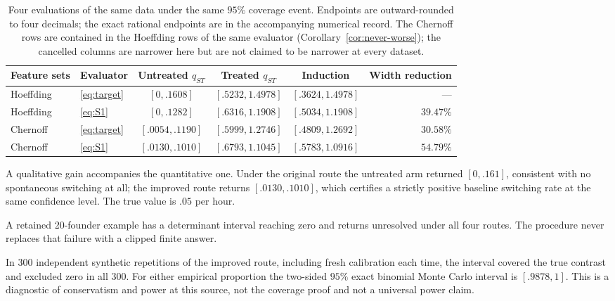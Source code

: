 \documentclass[11pt]{article}
\theoremstyle{definition}
\begin{document}
\begin{table}[tb]
\caption{Four evaluations of the same data under the same $95\%$ coverage event.
Endpoints are outward-rounded to four decimals; the exact rational
endpoints are in the accompanying numerical record. The
Chernoff rows are contained in the Hoeffding rows of the same evaluator
(Corollary~\ref{cor:never-worse}); the cancelled columns are narrower here but
are not claimed to be narrower at every dataset.}
\label{tab:routes}\centering\small
\begin{tabular}{llccc r}
\toprule
Feature sets & Evaluator & Untreated $q_{ST}$ & Treated $q_{ST}$ & Induction &
Width reduction\\
\midrule
Hoeffding & \eqref{eq:target} & $[0,.1608]$ & $[.5232,1.4978]$ & $[.3624,1.4978]$ & ---\\
Hoeffding & \eqref{eq:S1}     & $[0,.1282]$ & $[.6316,1.1908]$ & $[.5034,1.1908]$ & $39.47\%$\\
Chernoff  & \eqref{eq:target} & $[.0054,.1190]$ & $[.5999,1.2746]$ & $[.4809,1.2692]$ & $30.58\%$\\
Chernoff  & \eqref{eq:S1}     & $[.0130,.1010]$ & $[.6793,1.1045]$ & $[.5783,1.0916]$ & $54.79\%$\\
\bottomrule
\end{tabular}
\end{table}

A qualitative gain accompanies the quantitative one. Under the original route
the untreated arm returned $[0,.161]$, consistent with no spontaneous switching
at all; the improved route returns $[.0130,.1010]$, which certifies a strictly
positive baseline switching rate at the same confidence level. The true value is
$.05$ per hour.

A retained 20-founder example has a determinant interval reaching zero and
returns unresolved under all four routes. The procedure never replaces that
failure with a clipped finite answer.

In 300 independent synthetic repetitions of the improved route, including fresh
calibration each time, the interval covered the true contrast and excluded zero
in all 300. For either empirical proportion the two-sided $95\%$ exact binomial
Monte Carlo interval is $[.9878,1]$. This is a diagnostic of conservatism and
power at this source, not the coverage proof and not a universal power claim.
\end{document}
